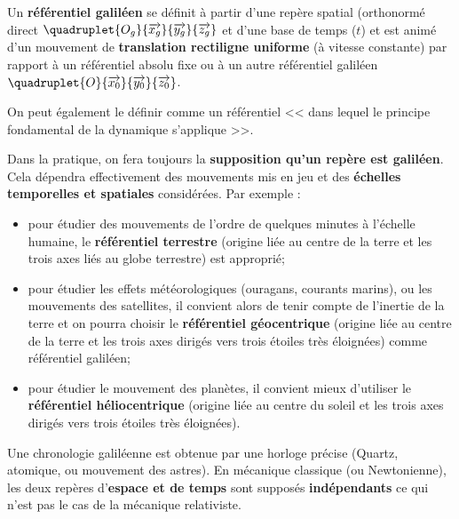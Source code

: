 \begin{defi}

Un \textbf{référentiel galiléen} se définit à partir d'une repère spatial 
(orthonormé direct $\quadruplet{O_g}{\overrightarrow{x_g}}{\overrightarrow{y_g}}{\overrightarrow{z_g}}$ et d'une base de temps ($t$) et est animé d'un mouvement de \textbf{translation rectiligne uniforme} (à vitesse constante) par rapport à un référentiel absolu fixe ou à un autre référentiel galiléen $\quadruplet{O}{\overrightarrow{x_0}}{\overrightarrow{y_0}}{\overrightarrow{z_0}}$. 

On peut également le définir comme un référentiel << dans lequel le principe fondamental de la dynamique s'applique >>.
\end{defi}

\begin{remarque}
Dans la pratique, on fera toujours la \textbf{supposition qu'un repère est galiléen}. Cela dépendra effectivement des mouvements mis en jeu et des \textbf{échelles temporelles et spatiales} considérées. 
Par exemple :
\begin{itemize}
\item pour étudier des mouvements de l'ordre de quelques minutes à l'échelle humaine, le \textbf{référentiel terrestre} (origine liée au centre de la terre et les trois axes liés au globe terrestre) est approprié;
\item pour étudier les effets météorologiques (ouragans, courants marins), ou les mouvements des satellites, il convient alors de tenir compte de l'inertie de la terre et on pourra choisir le \textbf{référentiel géocentrique} (origine liée au centre de la terre et les trois axes dirigés vers trois étoiles très éloignées) comme référentiel galiléen;
\item pour étudier le mouvement des planètes, il convient mieux d'utiliser le \textbf{référentiel héliocentrique} (origine liée au centre du soleil et les trois axes dirigés vers trois étoiles très éloignées).
\end{itemize}

Une chronologie galiléenne est obtenue par une horloge précise (Quartz, atomique, ou mouvement des astres).
En mécanique classique (ou Newtonienne), les deux repères d'\textbf{espace et de temps} sont supposés \textbf{indépendants} ce qui n'est pas le cas de la mécanique relativiste. 
\end{remarque}



